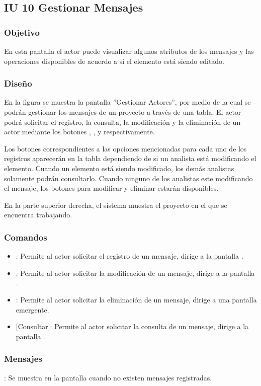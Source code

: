 \subsection{IU 10 Gestionar Mensajes}

\subsubsection{Objetivo}
	En esta pantalla el actor puede visualizar algunos atributos de los mensajes y las operaciones disponibles de acuerdo a si el elemento está siendo editado.
\subsubsection{Diseño}
	En la figura  se muestra la pantalla ''Gestionar Actores'', por medio de la cual se podrán gestionar los mensajes de un proyecto a través de una tabla. El actor podrá solicitar el registro, la consulta, la modificación y la eliminación de un actor mediante los botones , , \editar y \eliminar respectivamente.
	
	Los botones correspondientes a las opciones mencionadas para cada uno de los registros aparecerán en la tabla dependiendo de si un analista está modificando el elemento. Cuando un elemento está siendo modificado, los demás analistas solamente podrán consultarlo. Cuando ninguno de los analistas este modificando el mensaje, los botones para modificar y eliminar
	estarán disponibles.
	
	En la parte superior derecha, el sistema muestra el proyecto en el que se encuentra trabajando.

\subsubsection{Comandos}
\begin{itemize}
	\item {}: Permite al actor solicitar el registro de un mensaje, dirige a la pantalla .
	\item \editar [Modificar]: Permite al actor solicitar la modificación de un mensaje, dirige a la pantalla .
	\item \eliminar [Eliminar]: Permite al actor solicitar la eliminación de un mensaje, dirige a una pantalla emergente.
	\item {} [Consultar]: Permite al actor solicitar la consulta de un mensaje, dirige a la pantalla  .
\end{itemize}
\subsubsection{Mensajes}

\begin{Citemize}
	\item {}: Se muestra en la pantalla  cuando no existen mensajes registradas.
\end{Citemize}
